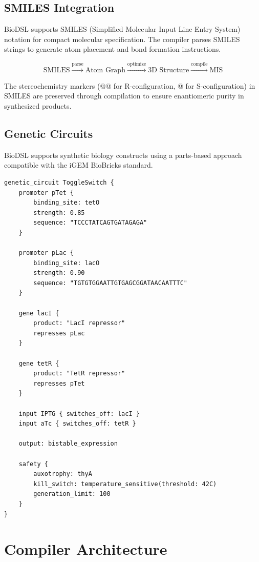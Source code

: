 \documentclass[12pt,a4paper]{article}
\begin{document}
\subsection{SMILES Integration}

BioDSL supports SMILES (Simplified Molecular Input Line Entry System) notation for compact molecular specification. The compiler parses SMILES strings to generate atom placement and bond formation instructions.

\begin{equation}
\text{SMILES} \xrightarrow{\text{parse}} \text{Atom Graph} \xrightarrow{\text{optimize}} \text{3D Structure} \xrightarrow{\text{compile}} \text{MIS}
\end{equation}

The stereochemistry markers (@@ for R-configuration, @ for S-configuration) in SMILES are preserved through compilation to ensure enantiomeric purity in synthesized products.

\subsection{Genetic Circuits}

BioDSL supports synthetic biology constructs using a parts-based approach compatible with the iGEM BioBricks standard.

\begin{lstlisting}[style=biodsl,caption={BioDSL genetic toggle switch definition}]
genetic_circuit ToggleSwitch {
    promoter pTet {
        binding_site: tetO
        strength: 0.85
        sequence: "TCCCTATCAGTGATAGAGA"
    }

    promoter pLac {
        binding_site: lacO
        strength: 0.90
        sequence: "TGTGTGGAATTGTGAGCGGATAACAATTTC"
    }

    gene lacI {
        product: "LacI repressor"
        represses pLac
    }

    gene tetR {
        product: "TetR repressor"
        represses pTet
    }

    input IPTG { switches_off: lacI }
    input aTc { switches_off: tetR }

    output: bistable_expression

    safety {
        auxotrophy: thyA
        kill_switch: temperature_sensitive(threshold: 42C)
        generation_limit: 100
    }
}
\end{lstlisting}

\section{Compiler Architecture}
\end{document}
